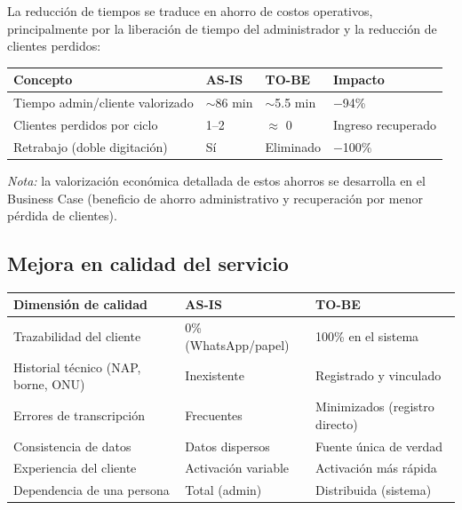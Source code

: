 La reducción de tiempos se traduce en ahorro de costos operativos, principalmente por
la liberación de tiempo del administrador y la reducción de clientes perdidos:

\begin{center}
\label{tab:comp-costos}
\begin{tabularx}{\textwidth}{L{4cm} X X X}
\toprule
\textbf{Concepto} & \textbf{AS-IS} & \textbf{TO-BE} & \textbf{Impacto} \\
\midrule
Tiempo admin/cliente valorizado & $\sim$86 min & $\sim$5.5 min & $-$94\% \\
Clientes perdidos por ciclo & 1--2 & $\approx$ 0 & Ingreso recuperado \\
Retrabajo (doble digitación) & Sí & Eliminado & $-$100\% \\
\bottomrule
\end{tabularx}
\end{center}

\textit{Nota:} la valorización económica detallada de estos ahorros se desarrolla en
el Business Case (beneficio de ahorro administrativo y recuperación por menor pérdida
de clientes).

\subsection{Mejora en calidad del servicio}

\begin{center}
\label{tab:comp-calidad}
\begin{tabularx}{\textwidth}{L{4cm} X X}
\toprule
\textbf{Dimensión de calidad} & \textbf{AS-IS} & \textbf{TO-BE} \\
\midrule
Trazabilidad del cliente & 0\% (WhatsApp/papel) & 100\% en el sistema \\
Historial técnico (NAP, borne, ONU) & Inexistente & Registrado y vinculado \\
Errores de transcripción & Frecuentes & Minimizados (registro directo) \\
Consistencia de datos & Datos dispersos & Fuente única de verdad \\
Experiencia del cliente & Activación variable & Activación más rápida \\
Dependencia de una persona & Total (admin) & Distribuida (sistema) \\
\bottomrule
\end{tabularx}
\end{center}

